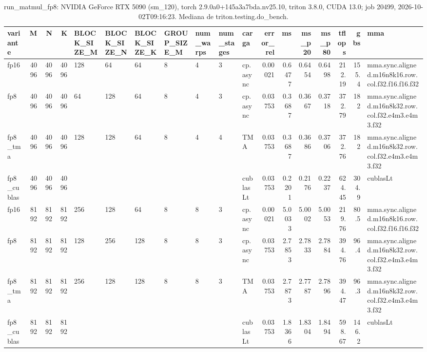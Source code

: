 \begin{table}[htbp]
  \centering\small
  \begin{tabular}{lrrrlllllllrrrrrrl}
    \toprule
    variante & M & N & K & BLOCK\_SIZE\_M & BLOCK\_SIZE\_N & BLOCK\_SIZE\_K & GROUP\_SIZE\_M & num\_warps & num\_stages & carga & error\_rel & ms & ms\_p20 & ms\_p80 & tflops & gbs & mma \\
    \midrule
    fp16 & 4096 & 4096 & 4096 & 128 & 64 & 64 & 8 & 4 & 3 & cp.async & 0.00021 & 0.6477 & 0.6454 & 0.6498 & 212.19 & 155.4 & mma.sync.aligned.m16n8k16.row.col.f32.f16.f16.f32 \\
    fp8 & 4096 & 4096 & 4096 & 64 & 128 & 64 & 8 & 4 & 3 & cp.async & 0.03753 & 0.3687 & 0.3667 & 0.3718 & 372.79 & 182 & mma.sync.aligned.m16n8k32.row.col.f32.e4m3.e4m3.f32 \\
    fp8\_tma & 4096 & 4096 & 4096 & 128 & 128 & 64 & 8 & 4 & 4 & TMA & 0.03753 & 0.3687 & 0.3686 & 0.3706 & 372.76 & 182 & mma.sync.aligned.m16n8k32.row.col.f32.e4m3.e4m3.f32 \\
    fp8\_cublas & 4096 & 4096 & 4096 &  &  &  &  &  &  & cublasLt & 0.03753 & 0.2201 & 0.2176 & 0.2237 & 624.45 & 304.9 & cublasLt \\
    fp16 & 8192 & 8192 & 8192 & 256 & 128 & 64 & 8 & 8 & 3 & cp.async & 0.00021 & 5.0033 & 5.0002 & 5.0053 & 219.76 & 80.5 & mma.sync.aligned.m16n8k16.row.col.f32.f16.f16.f32 \\
    fp8 & 8192 & 8192 & 8192 & 128 & 256 & 128 & 8 & 8 & 3 & cp.async & 0.03753 & 2.7853 & 2.7833 & 2.7884 & 394.76 & 96.4 & mma.sync.aligned.m16n8k32.row.col.f32.e4m3.e4m3.f32 \\
    fp8\_tma & 8192 & 8192 & 8192 & 256 & 128 & 128 & 8 & 8 & 3 & TMA & 0.03753 & 2.7873 & 2.7787 & 2.7896 & 394.47 & 96.3 & mma.sync.aligned.m16n8k32.row.col.f32.e4m3.e4m3.f32 \\
    fp8\_cublas & 8192 & 8192 & 8192 &  &  &  &  &  &  & cublasLt & 0.03753 & 1.8366 & 1.8304 & 1.8494 & 598.67 & 146.2 & cublasLt \\
    \bottomrule
  \end{tabular}
  \caption{run\_matmul\_fp8: NVIDIA GeForce RTX 5090 (sm\_120), torch 2.9.0a0+145a3a7bda.nv25.10, triton 3.8.0, CUDA 13.0; job 20499, 2026-10-02T09:16:23. Mediana de triton.testing.do\_bench.}
  \label{tab:pascal-run-matmul-fp8}
\end{table}
